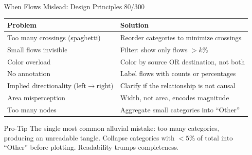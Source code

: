 \documentclass[10pt]{beamer}
\newcommand{\smark}[1]{\hfill{\scriptsize\color{codegray}#1}}
\begin{document}
\begin{frame}{When Flows Mislead: Design Principles}
\smark{80/300}
\centering\small
\begin{tabular}{@{}ll@{}}
    \toprule
    \textbf{Problem} & \textbf{Solution} \\
    \midrule
    Too many crossings (spaghetti)      & Reorder categories to minimize crossings \\
    Small flows invisible               & Filter: show only flows $> k$\% \\
    Color overload                      & Color by source OR destination, not both \\
    No annotation                       & Label flows with counts or percentages \\
    Implied directionality (left$\to$right) & Clarify if the relationship is not causal \\
    Area misperception                  & Width, not area, encodes magnitude \\
    Too many nodes                      & Aggregate small categories into ``Other'' \\
    \bottomrule
\end{tabular}

\vspace{0.3cm}
\begin{alertblock}{Pro-Tip}
    \scriptsize The single most common alluvial mistake: too many categories, producing an unreadable tangle. Collapse categories with $< 5$\% of total into ``Other'' before plotting. Readability trumps completeness.
\end{alertblock}
\end{frame}
\end{document}
